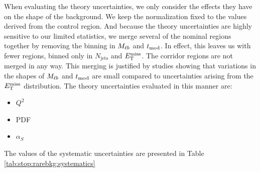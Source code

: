 When evaluating the theory uncertainties, we only consider the effects
they have on the shape of the background. We keep the normalization
fixed to the values derived from the control region. And because the
theory uncertainties are highly sensitive to our limited statistics,
we merge several of the nominal regions together by removing the
binning in $M_{\ell b}$ and $t_\text{mod}$. In effect, this leaves us
with fewer regions, binned only in $N_\text{jets}$ and $E_\text{T}^\text{miss}$. The
corridor regions are not merged in any way. This merging is justified
by studies showing that variations in the shapes of $M_{\ell b}$ and
$t_\text{mod}$ are small compared to uncertainties arising from the
$E_\text{T}^\text{miss}$ distribution. The theory uncertainties evaluated in this manner
are:
\begin{itemize}
\item $Q^2$
\item PDF
\item $\alpha_S$
\end{itemize}

The values of the systematic uncertainties are presented in Table
\ref{tab:stop:rarebkg:systematics}

